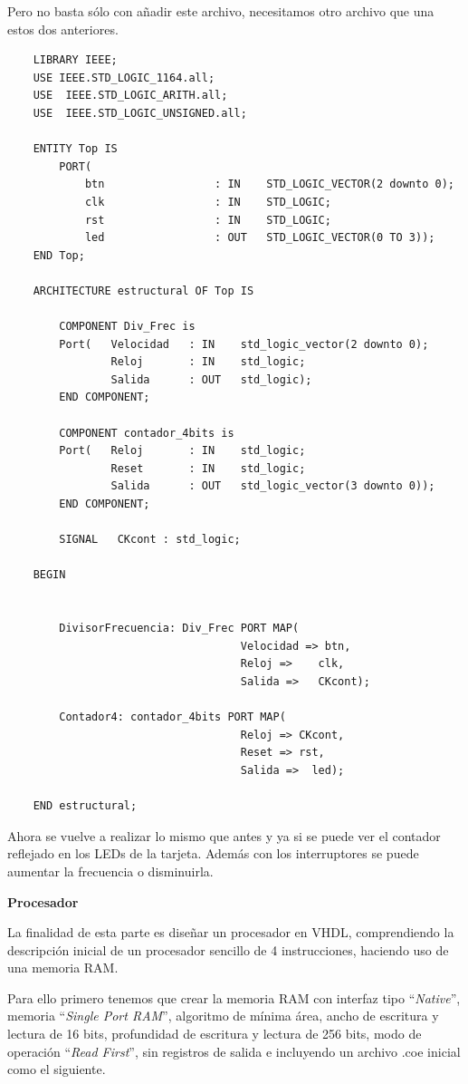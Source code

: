 Pero no basta sólo con añadir este archivo, necesitamos otro archivo que una estos dos anteriores. 

\begin{lstlisting}
    LIBRARY IEEE;
    USE IEEE.STD_LOGIC_1164.all;
    USE  IEEE.STD_LOGIC_ARITH.all;
    USE  IEEE.STD_LOGIC_UNSIGNED.all;
    
    ENTITY Top IS
        PORT(
            btn       			: IN	STD_LOGIC_VECTOR(2 downto 0);
            clk					: IN	STD_LOGIC;
            rst   				: IN    STD_LOGIC;
            led                 : OUT	STD_LOGIC_VECTOR(0 TO 3));
    END Top;
    
    ARCHITECTURE estructural OF Top IS
    
        COMPONENT Div_Frec is 
        Port(	Velocidad 	: IN 	std_logic_vector(2 downto 0);
                Reloj	    : IN	std_logic;
                Salida		: OUT	std_logic);
        END COMPONENT;
    
        COMPONENT contador_4bits is 
        Port(	Reloj		: IN	std_logic;
                Reset		: IN	std_logic;
                Salida	    : OUT	std_logic_vector(3 downto 0));
        END COMPONENT;
            
        SIGNAL   CKcont : std_logic;
    
    BEGIN
        
    
        DivisorFrecuencia: Div_Frec PORT MAP(
                                    Velocidad => btn,
                                    Reloj =>    clk,
                                    Salida =>   CKcont);
                                    
        Contador4: contador_4bits PORT MAP(
                                    Reloj => CKcont,
                                    Reset => rst,
                                    Salida =>  led);	
    
    END estructural;
\end{lstlisting}

Ahora se vuelve a realizar lo mismo que antes y ya si se puede ver el contador reflejado en los LEDs de la tarjeta. 
Además con los interruptores se puede aumentar la frecuencia o disminuirla.

\textbf{Procesador}

La finalidad de esta parte es diseñar un procesador en VHDL, comprendiendo la descripción inicial de un procesador sencillo 
de 4 instrucciones, haciendo uso de una memoria RAM.

Para ello primero tenemos que crear la memoria RAM con interfaz tipo ``\textit{Native}'', 
memoria ``\textit{Single Port RAM}'', algoritmo de mínima área, ancho de escritura y lectura de 16 bits, profundidad de escritura 
y lectura de 256 bits, modo de operación ``\textit{Read First}'', sin registros de salida e incluyendo un archivo .coe inicial como 
el siguiente.

